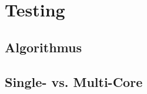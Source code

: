 \section{Testing}
\label{Testing}

\subsection{Algorithmus}
\label{Algorithmus}

\subsection{Single- vs. Multi-Core}
\label{SMCore}